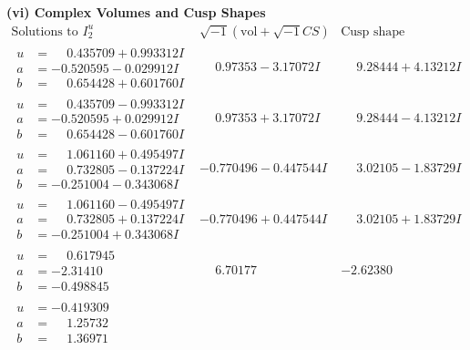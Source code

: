 \documentclass[1p]{elsarticle_modified}
\theoremstyle{definition}
\newcommand{\I}{\sqrt{-1}}
\begin{document}
\newpage\flushleft \textbf{(vi) Complex Volumes and Cusp Shapes}
$$\begin{array}{c|c|c}  
\text{Solutions to }I^u_{2}& \I (\text{vol} + \sqrt{-1}CS) & \text{Cusp shape}\\
 \hline 
\begin{aligned}
u &= \phantom{-}0.435709 + 0.993312 I \\
a &= -0.520595 - 0.029912 I \\
b &= \phantom{-}0.654428 + 0.601760 I\end{aligned}
 & \phantom{-}0.97353 - 3.17072 I & \phantom{-}9.28444 + 4.13212 I \\ \hline\begin{aligned}
u &= \phantom{-}0.435709 - 0.993312 I \\
a &= -0.520595 + 0.029912 I \\
b &= \phantom{-}0.654428 - 0.601760 I\end{aligned}
 & \phantom{-}0.97353 + 3.17072 I & \phantom{-}9.28444 - 4.13212 I \\ \hline\begin{aligned}
u &= \phantom{-}1.061160 + 0.495497 I \\
a &= \phantom{-}0.732805 - 0.137224 I \\
b &= -0.251004 - 0.343068 I\end{aligned}
 & -0.770496 - 0.447544 I & \phantom{-}3.02105 - 1.83729 I \\ \hline\begin{aligned}
u &= \phantom{-}1.061160 - 0.495497 I \\
a &= \phantom{-}0.732805 + 0.137224 I \\
b &= -0.251004 + 0.343068 I\end{aligned}
 & -0.770496 + 0.447544 I & \phantom{-}3.02105 + 1.83729 I \\ \hline\begin{aligned}
u &= \phantom{-}0.617945\phantom{ +0.000000I} \\
a &= -2.31410\phantom{ +0.000000I} \\
b &= -0.498845\phantom{ +0.000000I}\end{aligned}
 & \phantom{-}6.70177\phantom{ +0.000000I} & -2.62380\phantom{ +0.000000I} \\ \hline\begin{aligned}
u &= -0.419309\phantom{ +0.000000I} \\
a &= \phantom{-}1.25732\phantom{ +0.000000I} \\
b &= \phantom{-}1.36971\phantom{ +0.000000I}\end{aligned}

\end{array}$$
\end{document}
